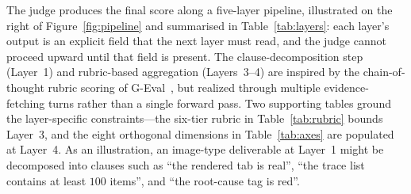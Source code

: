 \documentclass{llmxive}
\begin{document}
The judge produces the final score along a five-layer pipeline, illustrated on the right of Figure~\ref{fig:pipeline} and summarised in Table~\ref{tab:layers}: each layer's output is an explicit field that the next layer must read, and the judge cannot proceed upward until that field is present. The clause-decomposition step (Layer~1) and rubric-based aggregation (Layers~3--4) are inspired by the chain-of-thought rubric scoring of G-Eval~\citep{liu2023geval}, but realized through multiple evidence-fetching turns rather than a single forward pass. Two supporting tables ground the layer-specific constraints---the six-tier rubric in Table~\ref{tab:rubric} bounds Layer~3, and the eight orthogonal dimensions in Table~\ref{tab:axes} are populated at Layer~4. As an illustration, an image-type deliverable at Layer~1 might be decomposed into clauses such as ``the rendered tab is real'', ``the trace list contains at least $100$ items'', and ``the root-cause tag is red''.
\end{document}
